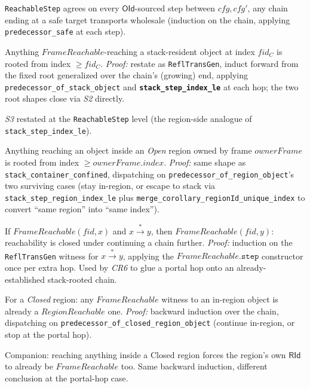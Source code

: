 \documentclass[11pt]{article}
\newcommand{\thm}[1]{\textbf{\texttt{#1}}}
\begin{document}
\begin{description}[nosep]
    \texttt{ReachableStep} agrees on every $\mathsf{OId}$-sourced step between $cfg,cfg'$, any
    chain ending at a safe target transports wholesale (induction on the chain, applying
    \texttt{predecessor\_safe} at each step).
  \item[\thm{stack\_container\_confined}] Anything $\mathit{FrameReachable}$-reaching a
    stack-resident object at index $fid_C$ is rooted from index $\ge fid_C$. \emph{Proof:} restate
    as \texttt{ReflTransGen}, induct forward from the fixed root generalized over the chain's
    (growing) end, applying \texttt{predecessor\_of\_stack\_object} and
    \thm{stack\_step\_index\_le} at each hop; the two root shapes close via \textit{S2} directly.
  \item[\thm{stack\_step\_region\_index\_le}] \textit{S3} restated at the \texttt{ReachableStep}
    level (the region-side analogue of \texttt{stack\_step\_index\_le}).
  \item[\thm{region\_container\_confined}] Anything reaching an object inside an \emph{Open}
    region owned by frame $ownerFrame$ is rooted from index $\ge ownerFrame.index$. \emph{Proof:}
    same shape as \texttt{stack\_container\_confined}, dispatching on
    \texttt{predecessor\_of\_region\_object}'s two surviving cases (stay in-region, or escape to
    stack via \texttt{stack\_step\_region\_index\_le} plus
    \texttt{merge\_corollary\_regionId\_unique\_index} to convert ``same region'' into ``same
    index'').
  \item[\thm{FrameReachable\_extend}] If $\mathit{FrameReachable}(fid,x)$ and $x \xrightarrow{*} y$,
    then $\mathit{FrameReachable}(fid,y)$: reachability is closed under continuing a chain further.
    \emph{Proof:} induction on the \texttt{ReflTransGen} witness for $x \xrightarrow{*} y$, applying
    the $\mathit{FrameReachable}.\texttt{step}$ constructor once per extra hop. Used by \textit{CR6}
    to glue a portal hop onto an already-established stack-rooted chain.
  \item[\thm{RegionReachable\_of\_FrameReachable\_closed}] For a \emph{Closed} region: any
    $\mathit{FrameReachable}$ witness to an in-region object is already a
    $\mathit{RegionReachable}$ one. \emph{Proof:} backward induction over the chain, dispatching on
    \texttt{predecessor\_of\_closed\_region\_object} (continue in-region, or stop at the portal
    hop).
  \item[\thm{FrameReachable\_rid\_of\_closed\_container}] Companion: reaching anything inside a
    Closed region forces the region's own $\mathsf{RId}$ to already be $\mathit{FrameReachable}$
    too. Same backward induction, different conclusion at the portal-hop case.
\end{description}
\end{document}
